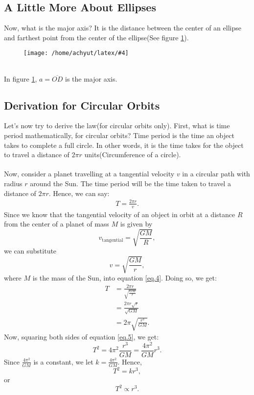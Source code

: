 \documentclass[a4paper]{report}
\newcommand{\mkfig}[5]{
  \begin{figure}[#1]
    \centering
    \texttt{[image: /home/achyut/latex/\#4]}
    \caption{\centering{#5}}
    \label{fig.#2}
  \end{figure}
}
\begin{document}
\subsection{A Little More About Ellipses}
Now, what is the major axis? It is the distance between the center of an ellipse and farthest point from the 
center of the ellipse(See figure \ref{fig.6}).
\mkfig{h!}{6}{2}{presentation.6.png}{Major axis of ellipse} \\
In figure \ref{fig.6}, $a=\overline{OD}$ is the major axis. \\

\subsection{Derivation for Circular Orbits}
Let's now try to derive the law(for circular orbits only).
First, what is time period mathematically, for circular orbits? Time period is the time an object takes to 
complete a full circle. In other words, it is the time takes for the object to travel a 
distance of $2\pi r$ units(Circumference of a circle).\\\\
Now, consider a planet travelling at a tangential velocity $v$ in a circular path with radius $r$ around the Sun. 
The time period will be the time taken to travel a distance of $2\pi r$. Hence, we can say: 
\begin{align}\label{eq.4}
T=\frac{2\pi r}{v}.
\end{align}
Since we know that the tangential velocity of an object in orbit at a distance $R$ from the center of a planet 
of mass $M$ is 
given by $$v_{\text{tangential}}=\sqrt{\frac{GM}{R}},$$
we can substitute $$v=\sqrt{\frac{GM}{r}},$$
where $M$ is the mass of the Sun, into equation \ref{eq.4}. Doing so, we get: 
\begin{equation} \label{eq.5}
  \begin{split}
    T &= \frac{2\pi r}{\sqrt{\frac{GM}{r}}} \\
    &= \frac{2\pi r\sqrt{r}}{\sqrt{GM}}\\
    &= 2\pi\sqrt{\frac{r^3}{GM}}.
  \end{split}
\end{equation}
Now, squaring both sides of equation \ref{eq.5}, we get: $$T^2=4\pi^2\frac{r^3}{GM}=\frac{4\pi^2}{GM}r^3.$$
Since $\frac{4\pi^2}{GM}$ is a constant, we let $k=\frac{4\pi^2}{GM}$. Hence, 
$$T^2=kr^3,$$ or $$\boxed{T^2\propto r^3}.$$
\end{document}
